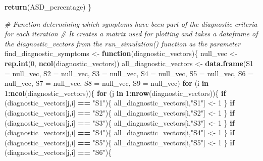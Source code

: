 \documentclass[]{article}
\newenvironment{Shaded}{\begin{snugshade}}{\end{snugshade}}
\newcommand{\KeywordTok}[1]{\textcolor[rgb]{0.13,0.29,0.53}{\textbf{#1}}}
\newcommand{\DataTypeTok}[1]{\textcolor[rgb]{0.13,0.29,0.53}{#1}}
\newcommand{\DecValTok}[1]{\textcolor[rgb]{0.00,0.00,0.81}{#1}}
\newcommand{\StringTok}[1]{\textcolor[rgb]{0.31,0.60,0.02}{#1}}
\newcommand{\CommentTok}[1]{\textcolor[rgb]{0.56,0.35,0.01}{\textit{#1}}}
\newcommand{\ControlFlowTok}[1]{\textcolor[rgb]{0.13,0.29,0.53}{\textbf{#1}}}
\newcommand{\OperatorTok}[1]{\textcolor[rgb]{0.81,0.36,0.00}{\textbf{#1}}}
\newcommand{\NormalTok}[1]{#1}
\begin{document}
\begin{Shaded}
\begin{Highlighting}[]
{{{{{{{{{{  \KeywordTok{return}\NormalTok{(ASD_percentage)}
\NormalTok{\}}


\CommentTok{# Function determining which symptoms have been part of the diagnostic criteria for each iteration}
\CommentTok{# It creates a matrix used for plotting and takes a dataframe of the diagnostic_vectors from the run_simulation() function as the parameter}
\NormalTok{find_diagnostic_symptoms <-}\StringTok{ }\ControlFlowTok{function}\NormalTok{(diagnostic_vectors)\{}
\NormalTok{  null_vec <-}\StringTok{ }\KeywordTok{rep.int}\NormalTok{(}\DecValTok{0}\NormalTok{, }\KeywordTok{ncol}\NormalTok{(diagnostic_vectors))}
\NormalTok{  all_diagnostic_vectors <-}\StringTok{ }\KeywordTok{data.frame}\NormalTok{(}\DataTypeTok{S1 =}\NormalTok{ null_vec, }\DataTypeTok{S2 =}\NormalTok{ null_vec, }\DataTypeTok{S3 =}\NormalTok{ null_vec, }\DataTypeTok{S4 =}\NormalTok{ null_vec, }\DataTypeTok{S5 =}\NormalTok{ null_vec, }\DataTypeTok{S6 =}\NormalTok{ null_vec, }\DataTypeTok{S7 =}\NormalTok{ null_vec, }\DataTypeTok{S8 =}\NormalTok{ null_vec, }\DataTypeTok{S9 =}\NormalTok{ null_vec)}
  \ControlFlowTok{for}\NormalTok{ (i }\ControlFlowTok{in} \DecValTok{1}\OperatorTok{:}\KeywordTok{ncol}\NormalTok{(diagnostic_vectors))\{}
    \ControlFlowTok{for}\NormalTok{ (j }\ControlFlowTok{in} \DecValTok{1}\OperatorTok{:}\KeywordTok{nrow}\NormalTok{(diagnostic_vectors))\{}
      \ControlFlowTok{if}\NormalTok{ (diagnostic_vectors[j,i] }\OperatorTok{==}\StringTok{ "S1"}\NormalTok{)\{}
\NormalTok{        all_diagnostic_vectors[i,}\StringTok{"S1"}\NormalTok{] <-}\StringTok{ }\DecValTok{1}
\NormalTok{      \}}
      \ControlFlowTok{if}\NormalTok{ (diagnostic_vectors[j,i] }\OperatorTok{==}\StringTok{ "S2"}\NormalTok{)\{}
\NormalTok{        all_diagnostic_vectors[i,}\StringTok{"S2"}\NormalTok{] <-}\StringTok{ }\DecValTok{1}
\NormalTok{      \}}
      \ControlFlowTok{if}\NormalTok{ (diagnostic_vectors[j,i] }\OperatorTok{==}\StringTok{ "S3"}\NormalTok{)\{}
\NormalTok{        all_diagnostic_vectors[i,}\StringTok{"S3"}\NormalTok{] <-}\StringTok{ }\DecValTok{1}
\NormalTok{      \}}
      \ControlFlowTok{if}\NormalTok{ (diagnostic_vectors[j,i] }\OperatorTok{==}\StringTok{ "S4"}\NormalTok{)\{}
\NormalTok{        all_diagnostic_vectors[i,}\StringTok{"S4"}\NormalTok{] <-}\StringTok{ }\DecValTok{1}
\NormalTok{      \}}
      \ControlFlowTok{if}\NormalTok{ (diagnostic_vectors[j,i] }\OperatorTok{==}\StringTok{ "S5"}\NormalTok{)\{}
\NormalTok{        all_diagnostic_vectors[i,}\StringTok{"S5"}\NormalTok{] <-}\StringTok{ }\DecValTok{1}
\NormalTok{      \}}
      \ControlFlowTok{if}\NormalTok{ (diagnostic_vectors[j,i] }\OperatorTok{==}\StringTok{ "S6"}\NormalTok{)\{}
}}}}}}}}}}
\end{Highlighting}
\end{Shaded}
\end{document}
